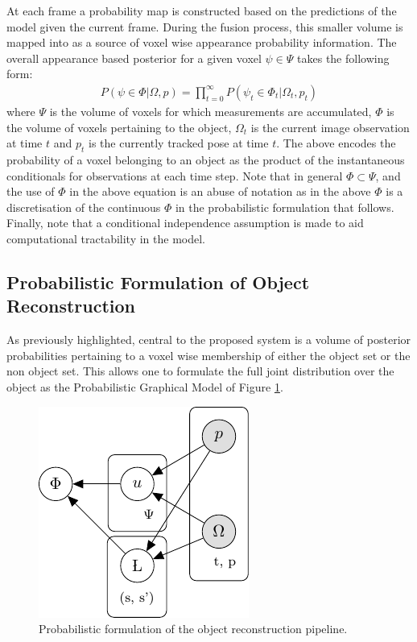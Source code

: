 At each frame a probability map is constructed based on the predictions of the model given the current frame. During the fusion process, this 
smaller volume is mapped into as a source of voxel wise appearance probability information. The overall appearance based posterior for a given voxel 
$\psi \in \Psi$ takes the following form:
\begin{equation}
\begin{split}
P(\psi \in \Phi | \Omega, p) = \prod_{t=0}^{\infty} P(\psi_{t} \in \Phi_{t} | \Omega_{t}, p_{t})
\end{split}
\end{equation}
where $\Psi$ is the volume of voxels for which measurements are accumulated, $\Phi$ 
is the volume of voxels pertaining to the object, $\Omega_{t}$ is the current image observation at time $t$ and $p_{t}$ is the 
currently tracked pose at time $t$.
The above encodes the probability of a voxel belonging to an object as the product of the instantaneous conditionals for observations at each time step. 
Note that in general $\Phi \subset \Psi$, and the use of $\Phi$ in the above equation is an abuse of notation as in the above 
$\Phi$ is a discretisation of the continuous $\Phi$ in the probabilistic formulation that follows. Finally, note that a conditional 
independence assumption is made to aid computational tractability in the model.

\subsection{Probabilistic Formulation of Object Reconstruction}
As previously highlighted, central to the proposed system is a volume of posterior probabilities pertaining to a voxel wise membership of either the 
object set or the non object set. This allows one to formulate the full joint distribution over the object as the Probabilistic 
Graphical Model of Figure \ref{pgm1}.
\begin{figure}[h]
	\centering
	\includegraphics{graphical_models/pgm1.pdf}
	\caption{Probabilistic formulation of the object reconstruction pipeline.}
	\label{pgm1}
\end{figure}

